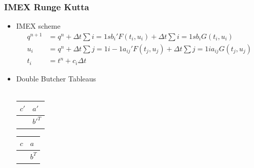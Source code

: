 \documentclass[10pt]{beamer}
\begin{document}
      \begin{frame}
        \frametitle{IMEX Runge Kutta}
        \begin{itemize}
          \item IMEX scheme
            \begin{align*}
              q^{n+1} &= q^n + \Delta t \sum{i = 1}{s}{b_i' F(t_i, u_i)} + \Delta t \sum{i=1}{s}{b_i G(t_i, u_i)} \\
              u_i &= q^n + \Delta t \sum{j = 1}{i-1}{a_{ij}' F(t_j, u_j)} + \Delta t \sum{j=1}{i}{a_{ij} G(t_j, u_j)} \\
              t_i &= t^n + c_i \Delta t
            \end{align*}

          \item Double Butcher Tableaus \hfill \\ \hfill \\
            \begin{tabular}{r|l}
              \(c'\) & \(a'\) \\
              \midrule
                & \(b'^T\)
            \end{tabular}
            \begin{tabular}{r|l}
              \(c\) & \(a\) \\
              \midrule
                & \(b^T\)
            \end{tabular}
        \end{itemize}
      \end{frame}
\end{document}
